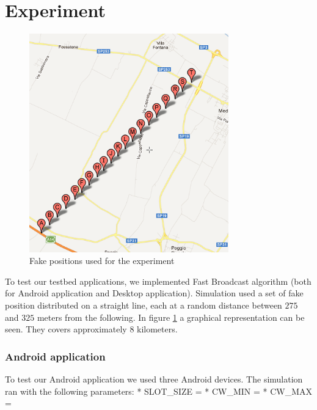 \section{Experiment}
	\begin{figure}[htbp]
	\centering
	\includegraphics[width=3.4in]{imgs/punti_mappa.png}
	\caption{Fake positions used for the experiment}
	\label{fig:positions_experiment}
	\end{figure}

To test our testbed applications, we implemented Fast Broadcast algorithm (both for Android application and Desktop application). Simulation used a set of fake position distributed on a straight line, each at a random distance between $275$ and $325$ meters from the following. In figure \ref{fig:positions_experiment} a graphical representation can be seen. They covers approximately $8$ kilometers.

\subsubsection{Android application}
To test our Android application we used three Android devices. The simulation ran with the following parameters:
	* SLOT_SIZE = 
	* CW_MIN = 
	* CW_MAX =
